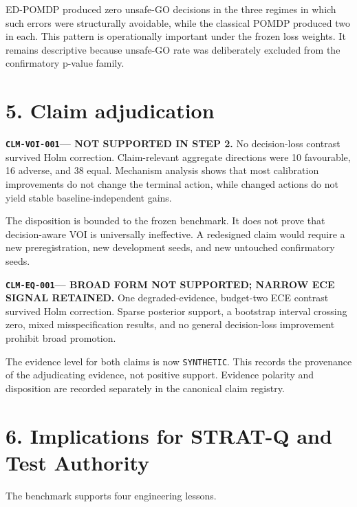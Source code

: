 \documentclass[11pt,a4paper]{article}
\newcommand{\voi}{\texttt{CLM-VOI-001}}
\newcommand{\eqclaim}{\texttt{CLM-EQ-001}}
\begin{document}
ED-POMDP produced zero unsafe-GO decisions in the three regimes in which such errors were structurally avoidable, while the classical POMDP produced two in each. This pattern is operationally important under the frozen loss weights. It remains descriptive because unsafe-GO rate was deliberately excluded from the confirmatory p-value family.

\section*{5. Claim adjudication}

\begin{tcolorbox}[colback=softred,colframe=red!60!black,boxrule=0.7pt,arc=2mm]
\textbf{\voi --- NOT SUPPORTED IN STEP 2.} No decision-loss contrast survived Holm correction. Claim-relevant aggregate directions were 10 favourable, 16 adverse, and 38 equal. Mechanism analysis shows that most calibration improvements do not change the terminal action, while changed actions do not yield stable baseline-independent gains.
\end{tcolorbox}

The disposition is bounded to the frozen benchmark. It does not prove that decision-aware VOI is universally ineffective. A redesigned claim would require a new preregistration, new development seeds, and new untouched confirmatory seeds.

\begin{tcolorbox}[colback=softamber,colframe=orange!70!black,boxrule=0.7pt,arc=2mm]
\textbf{\eqclaim --- BROAD FORM NOT SUPPORTED; NARROW ECE SIGNAL RETAINED.} One degraded-evidence, budget-two ECE contrast survived Holm correction. Sparse posterior support, a bootstrap interval crossing zero, mixed misspecification results, and no general decision-loss improvement prohibit broad promotion.
\end{tcolorbox}

The evidence level for both claims is now \texttt{SYNTHETIC}. This records the provenance of the adjudicating evidence, not positive support. Evidence polarity and disposition are recorded separately in the canonical claim registry.

\section*{6. Implications for STRAT-Q and Test Authority}

The benchmark supports four engineering lessons.
\end{document}
